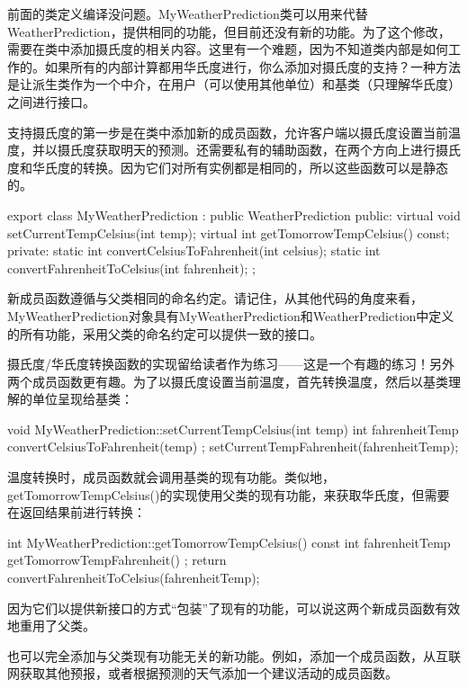 前面的类定义编译没问题。MyWeatherPrediction类可以用来代替WeatherPrediction，提供相同的功能，但目前还没有新的功能。为了这个修改，需要在类中添加摄氏度的相关内容。这里有一个难题，因为不知道类内部是如何工作的。如果所有的内部计算都用华氏度进行，你么添加对摄氏度的支持？一种方法是让派生类作为一个中介，在用户（可以使用其他单位）和基类（只理解华氏度）之间进行接口。

支持摄氏度的第一步是在类中添加新的成员函数，允许客户端以摄氏度设置当前温度，并以摄氏度获取明天的预测。还需要私有的辅助函数，在两个方向上进行摄氏度和华氏度的转换。因为它们对所有实例都是相同的，所以这些函数可以是静态的。

\begin{cpp}
export class MyWeatherPrediction : public WeatherPrediction
{
    public:
        virtual void setCurrentTempCelsius(int temp);
        virtual int getTomorrowTempCelsius() const;
    private:
        static int convertCelsiusToFahrenheit(int celsius);
        static int convertFahrenheitToCelsius(int fahrenheit);
};
\end{cpp}

新成员函数遵循与父类相同的命名约定。请记住，从其他代码的角度来看，MyWeatherPrediction对象具有MyWeatherPrediction和WeatherPrediction中定义的所有功能，采用父类的命名约定可以提供一致的接口。

摄氏度/华氏度转换函数的实现留给读者作为练习——这是一个有趣的练习！另外两个成员函数更有趣。为了以摄氏度设置当前温度，首先转换温度，然后以基类理解的单位呈现给基类：

\begin{cpp}
void MyWeatherPrediction::setCurrentTempCelsius(int temp)
{
    int fahrenheitTemp { convertCelsiusToFahrenheit(temp) };
    setCurrentTempFahrenheit(fahrenheitTemp);
}
\end{cpp}

温度转换时，成员函数就会调用基类的现有功能。类似地，getTomorrowTempCelsius()的实现使用父类的现有功能，来获取华氏度，但需要在返回结果前进行转换：

\begin{cpp}
int MyWeatherPrediction::getTomorrowTempCelsius() const
{
    int fahrenheitTemp { getTomorrowTempFahrenheit() };
    return convertFahrenheitToCelsius(fahrenheitTemp);
}
\end{cpp}

因为它们以提供新接口的方式“包装”了现有的功能，可以说这两个新成员函数有效地重用了父类。

也可以完全添加与父类现有功能无关的新功能。例如，添加一个成员函数，从互联网获取其他预报，或者根据预测的天气添加一个建议活动的成员函数。

